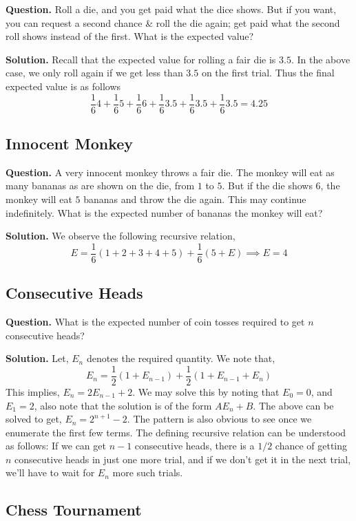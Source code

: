 \textbf{Question.} Roll a die, and you get paid what the dice shows. But if you want, you can request a second chance \& roll the die again; get paid what the second roll shows instead of the first. What is the expected value?

\textbf{Solution.} Recall that the expected value for rolling a fair die is $3.5$. In the above case, we only roll again if we get less than $3.5$ on the first trial. Thus the final expected value is as follows
\[\frac{1}{6} 4 + \frac{1}{6} 5 + \frac{1}{6} 6 + \frac{1}{6} 3.5 + \frac{1}{6} 3.5 + \frac{1}{6} 3.5 = 4.25\]

\subsection{Innocent Monkey}

\textbf{Question.} A very innocent monkey throws a fair die. The monkey will eat as many bananas as are shown on the die, from $1$ to $5$. But if the die shows $6$, the monkey will eat $5$ bananas and throw the die again. This may continue indefinitely. What is the expected number of bananas the monkey will eat?

\textbf{Solution.} We observe the following recursive relation, \[E = \frac{1}{6} (1+2+3+4+5) + \frac{1}{6} (5 + E) \implies E = 4\]

\subsection{Consecutive Heads}

\textbf{Question.} What is the expected number of coin tosses required to get $n$ consecutive heads?

\textbf{Solution.} Let, $E_n$ denotes the required quantity. We note that, \[E_n = \frac{1}{2} (1 + E_{n-1}) + \frac{1}{2} (1 + E_{n-1} + E_n)\]
This implies, $E_n = 2 E_{n-1} + 2$. We may solve this by noting that $E_0 = 0$, and $E_1 = 2$, also note that the solution is of the form $AE_n + B$. The above can be solved to get, $E_n = 2^{n+1} - 2$. The pattern is also obvious to see once we enumerate the first few terms.
The defining recursive relation can be understood as follows: If we can get $n-1$ consecutive heads, there is a $1/2$ chance of getting $n$ consecutive heads in just one more trial, and if we don't get it in the next trial, we'll have to wait for $E_n$ more such trials. 

\subsection{Chess Tournament}

